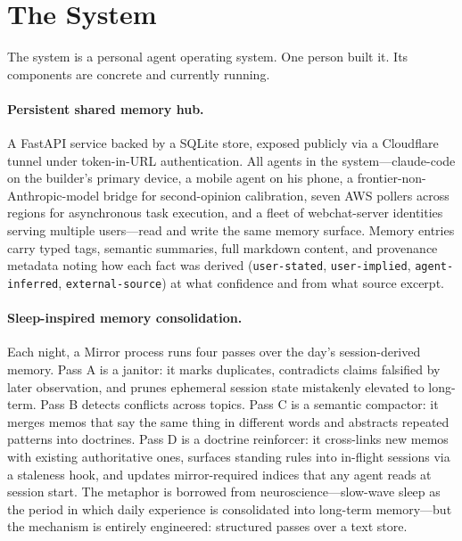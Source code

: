 \documentclass{article}
\begin{document}
\section{The System}

The system is a personal agent operating system. One person built it. Its components are concrete and currently running.

\paragraph{Persistent shared memory hub.}
A FastAPI service backed by a SQLite store, exposed publicly via a Cloudflare tunnel under token-in-URL authentication. All agents in the system---claude-code on the builder's primary device, a mobile agent on his phone, a frontier-non-Anthropic-model bridge for second-opinion calibration, seven AWS pollers across regions for asynchronous task execution, and a fleet of webchat-server identities serving multiple users---read and write the same memory surface. Memory entries carry typed tags, semantic summaries, full markdown content, and provenance metadata noting how each fact was derived (\texttt{user-stated}, \texttt{user-implied}, \texttt{agent-inferred}, \texttt{external-source}) at what confidence and from what source excerpt.

\paragraph{Sleep-inspired memory consolidation.}
Each night, a Mirror process runs four passes over the day's session-derived memory. Pass A is a janitor: it marks duplicates, contradicts claims falsified by later observation, and prunes ephemeral session state mistakenly elevated to long-term. Pass B detects conflicts across topics. Pass C is a semantic compactor: it merges memos that say the same thing in different words and abstracts repeated patterns into doctrines. Pass D is a doctrine reinforcer: it cross-links new memos with existing authoritative ones, surfaces standing rules into in-flight sessions via a staleness hook, and updates mirror-required indices that any agent reads at session start. The metaphor is borrowed from neuroscience---slow-wave sleep as the period in which daily experience is consolidated into long-term memory---but the mechanism is entirely engineered: structured passes over a text store.
\end{document}
